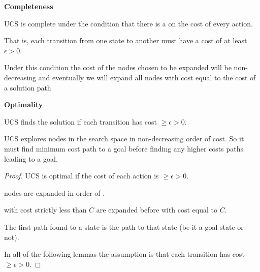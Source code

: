\begin{listu}
    \item \textbf{Completeness}
    
    \begin{listu}
        \item UCS is complete under the condition that there is a  on the cost of every action.

        That is, each transition from one state to another must have a cost of at least $\epsilon > 0$.

        \item Under  this condition the cost of the nodes chosen to be expanded will be non-decreasing and eventually we will expand all nodes with cost equal to the cost of a solution path
    \end{listu}

    \item \textbf{Optimality}
    
    \begin{listu}
        \item UCS finds the  solution if each transition has cost $\ge \epsilon > 0$.
        
        \item UCS explores nodes in the search space in non-decreasing order of cost. So it must find minimum cost path to a goal before finding any higher costs paths leading to a goal.
    \end{listu}

    \begin{proof}
        UCS is optimal if the cost of each action is $\ge \epsilon > 0$.

        \begin{remark}[Intuition]
            \begin{listu}
                \item nodes are expanded in order of .
                \item {} with cost strictly less than $C$ are expanded before  with cost equal to $C$.
                \item The first path found to a state is the  path to that state (be it a goal state or not).
            \end{listu}
        \end{remark}

        In all of the following lemmas the assumption is that each transition has cost $\ge \epsilon > 0$.


\end{proof}
\end{listu}

